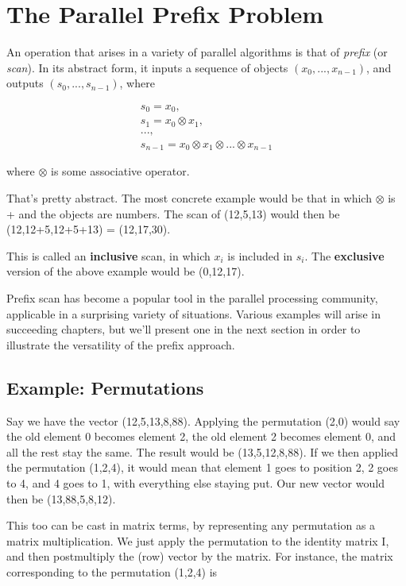 \chapter{The Parallel Prefix Problem} 
\label{chap:prefix}

An operation that arises in a variety of parallel algorithms is that of
{\it prefix} (or {\it scan}).  In its abstract form, it inputs a
sequence of objects $(x_0,...,x_{n-1})$, and outputs $(s_0,...,s_{n-1})$, where

\begin{equation}
\label{scandef}
\begin{array}{c}
s_0 = x_0, \\
s_1 = x_0 \otimes x_1, \\
..., \\
s_{n-1} = x_0 \otimes x_1 \otimes ... \otimes x_{n-1}
\end{array}
\end{equation}

where $\otimes$ is some associative operator.

That's pretty abstract.  The most concrete example would be that in
which $\otimes$ is + and the objects are numbers.  The scan of
(12,5,13) would then be (12,12+5,12+5+13) = (12,17,30).

This is called an {\bf inclusive} scan, in which $x_i$ is included in
$s_i$.  The {\bf exclusive} version of the above example would be
(0,12,17).

Prefix scan has become a popular tool in the parallel processing
community, applicable in a surprising variety of situations.  Various
examples will arise in succeeding chapters, but we'll present one in the
next section in order to illustrate the versatility of the prefix
approach.

\section{Example:  Permutations}
\label{fibprefix}

Say we have the vector (12,5,13,8,88).  Applying the permutation (2,0)
would say the old element 0 becomes element 2, the old element 2 becomes
element 0, and all the rest stay the same.  The result would be
(13,5,12,8,88).  If we then applied the permutation (1,2,4), it would
mean that element 1 goes to position 2, 2 goes to 4, and 4 goes to 1,
with everything else staying put.  Our new vector would then be
(13,88,5,8,12).

This too can be cast in matrix terms, by representing any permutation as
a matrix multiplication.  We just apply the permutation to the identity
matrix I, and then postmultiply the (row) vector by the matrix.  For
instance, the matrix corresponding to the permutation (1,2,4) is

